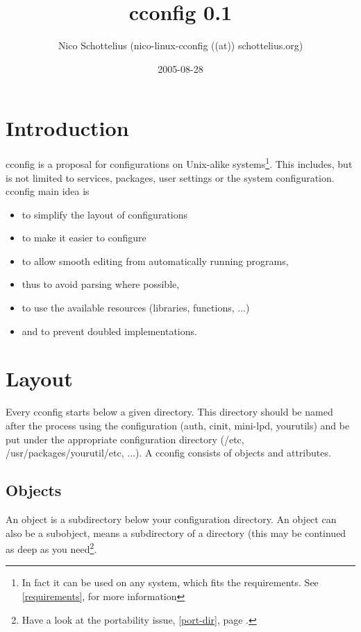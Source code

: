\documentclass[11pt,a4paper]{article}
\newcommand{\cemail}{nico-linux-cconfig ((at)) schottelius.org}
\begin{document}
\title{cconfig 0.1}
\date{2005-08-28}
\author{Nico Schottelius (\cemail)}
\maketitle
\newpage
\tableofcontents
\newpage
\section{Introduction}
cconfig is a proposal for configurations on Unix-alike
systems\footnote{In fact it can be used on any system, which
fits the requirements. See \ref{requirements}, \pageref{requirements} for more
information}. This includes, but is not limited to services, packages,
user settings or the system configuration. cconfig main idea is
\begin{itemize}
\item to simplify the layout of configurations
\item to make it easier to configure
\item to allow smooth editing from automatically running programs,
\item thus to avoid parsing where possible,
\item to use the available resources (libraries, functions, ...)
\item and to prevent doubled implementations.
\end{itemize}
\section{Layout}
Every cconfig starts below a given directory. This directory
should be named after the process using the configuration
(auth, cinit, mini-lpd, yourutils) and be put under the
appropriate configuration directory (/etc, /usr/packages/yourutil/etc, ...).
A cconfig consists of objects and attributes.
\subsection{Objects}
An object is a subdirectory below your configuration directory.
An object can also be a subobject, means a subdirectory of a
directory (this may be continued as deep as you
need\footnote{Have a look at the portability issue, \ref{port-dir},
page \pageref{port-dir}.}.
\end{document}
